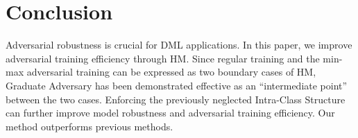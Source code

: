 \documentclass[10pt,twocolumn,letterpaper]{article}
\begin{document}
\section{Conclusion}
\label{sec:5}

Adversarial robustness is crucial for DML applications.
%
In this paper, we improve adversarial training efficiency through HM.
%
Since regular training and the min-max adversarial training can be expressed as
two boundary cases of HM, Graduate Adversary has been demonstrated effective as
an ``intermediate point'' between the two cases.
%
Enforcing the previously neglected Intra-Class Structure can further improve
model robustness and adversarial training efficiency.
%
Our method outperforms previous methods.

{\small


}


\end{document}
